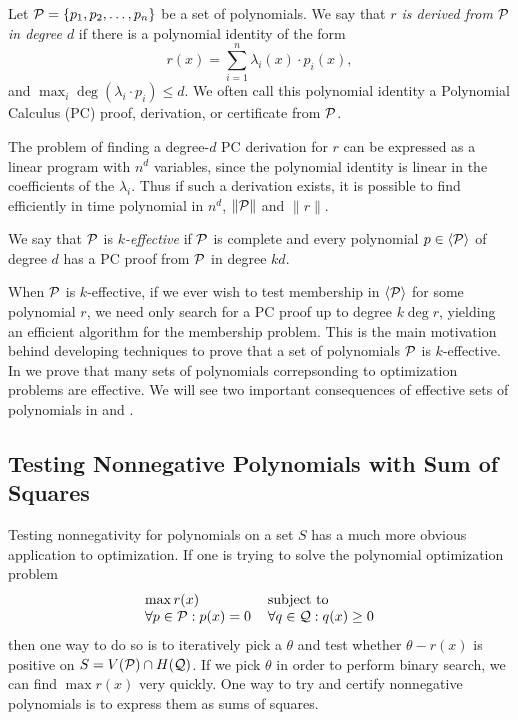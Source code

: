 \begin{definition}
Let $\mathcal P = \{p_1, p_2, \dots, p_n\}$ be a set of polynomials. We say that \emph{$r$ is derived from $\mathcal P$ in degree $d$} if there is a polynomial identity of the form
\[r(x) = \sum_{i=1}^n \lambda_i(x) \cdot p_i(x),\]
and $\max_i \deg(\lambda_i \cdot p_i) \leq d$. We often call this polynomial identity a Polynomial Calculus (PC) proof, derivation, or certificate from $\mathcal P$.
\end{definition} 

The problem of finding a degree-$d$ PC derivation for $r$ can be expressed as a linear program with $n^d$ variables, since the polynomial identity is linear in the coefficients of the $\lambda_i$. Thus if such a derivation exists, it is possible to find efficiently in time polynomial in $n^d$, $\|\mathcal P\|$ and $\|r\|$. 
\begin{definition}
We say that $\mathcal P$ is \emph{$k$-effective} if $\mathcal P$ is complete and every polynomial $p \in \langle \mathcal P \rangle$ of degree $d$ has a PC proof from $\mathcal P$ in degree $kd$.
\end{definition}
When $\mathcal P$ is $k$-effective, if we ever wish to test membership in $\langle \mathcal P \rangle$ for some polynomial $r$, we need only search for a PC proof up to degree $k \deg r$, yielding an efficient algorithm for the membership problem. This is the main motivation behind developing techniques to prove that a set of polynomials $\mathcal P$ is $k$-effective. In  we prove that many sets of polynomials correpsonding to optimization problems are effective. We will see two important consequences of effective sets of polynomials in  and .

\subsection{Testing Nonnegative Polynomials with Sum of Squares}

Testing nonnegativity for polynomials on a set $S$ has a much more obvious application to optimization. If one is trying to solve the polynomial optimization problem
\[\begin{tabular}{ll} $\max r(x)$ & subject to \\ $\forall p \in \cP: p(x) = 0$ & $\forall q \in \cQ: q(x) \geq 0$ \end{tabular}\]
then one way to do so is to iteratively pick a $\theta$ and test whether $\theta - r(x)$ is positive on $S = V(\mathcal P) \cap H(\mathcal Q)$. 
If we pick $\theta$ in order to perform binary search, we can find $\max r(x)$ very quickly. One way to try and certify nonnegative polynomials is to express them as sums of squares.

